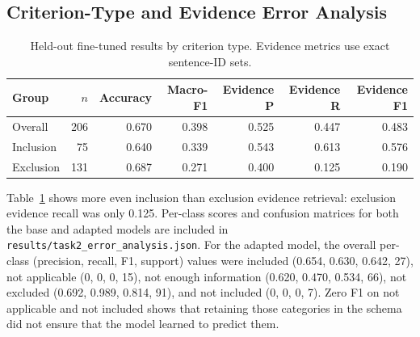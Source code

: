 \documentclass[conference]{IEEEtran}
\begin{document}
\subsection{Criterion-Type and Evidence Error Analysis}
\begin{table}[t]\centering\caption{Held-out fine-tuned results by criterion type. Evidence metrics use exact sentence-ID sets.}\label{tab:bytype}\begin{tabular}{lrrrrrr}\toprule Group & $n$ & Accuracy & Macro-F1 & Evidence P & Evidence R & Evidence F1 \\\midrule Overall & 206 & 0.670 & 0.398 & 0.525 & 0.447 & 0.483 \\
Inclusion & 75 & 0.640 & 0.339 & 0.543 & 0.613 & 0.576 \\
Exclusion & 131 & 0.687 & 0.271 & 0.400 & 0.125 & 0.190 \\\bottomrule\end{tabular}\end{table}
Table~\ref{tab:bytype} shows more even inclusion than exclusion evidence retrieval: exclusion evidence recall was only 0.125. Per-class scores and confusion matrices for both the base and adapted models are included in \texttt{results/task2\_error\_analysis.json}. For the adapted model, the overall per-class (precision, recall, F1, support) values were included (0.654, 0.630, 0.642, 27), not applicable (0, 0, 0, 15), not enough information (0.620, 0.470, 0.534, 66), not excluded (0.692, 0.989, 0.814, 91), and not included (0, 0, 0, 7). Zero F1 on not applicable and not included shows that retaining those categories in the schema did not ensure that the model learned to predict them.
\end{document}
